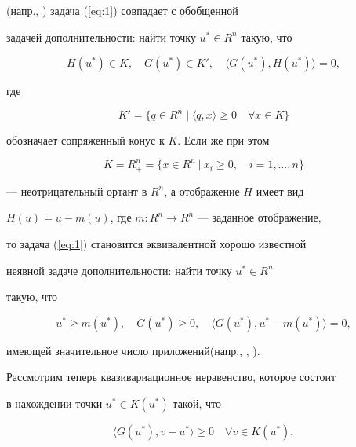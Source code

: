(напр., \cite{NNR93}) задача (\ref{eq:1}) совпадает с обобщенной 


задачей дополнительности: найти точку $u^{*} \in R^{n}$ такую, что 


$$


H(u^{*}) \in K, \quad G(u^{*}) \in K',


\quad \langle G(u^{*}), H(u^{*}) \rangle=0,


$$ 


где 


$$


K'=\{q \in R^{n} \mid \langle q, x \rangle \geq 0 \quad \forall x \in K \}


$$ 


обозначает сопряженный конус к $K$. Если же при этом


$$


K=R_{+}^{n}=\{ x \in R^{n} \ | \ x_{i} \geq 0, \quad i=1, \dotsc ,n \}


$$


--- неотрицательный ортант в $R^{n}$, а отображение $H$ имеет вид 


$H(u)=u - m(u)$, где $m: R^{n} \rightarrow R^{n}$ --- заданное отображение, 


то задача (\ref{eq:1}) становится эквивалентной хорошо известной 


неявной задаче дополнительности: найти точку $u^{*} \in R^{n}$ 


такую, что 


\begin{equation} \label{eq:2} 


u^{*} \geq m(u^{*}), \quad G(u^{*}) \geq 0, 


\quad \langle G(u^{*}), u^{*} - m(u^{*}) \rangle=0,


\end{equation}


имеющей значительное число приложений(напр., \cite{Pan81}, \cite{BL87}). 





Рассмотрим теперь квазивариационное неравенство, которое состоит 


в нахождении точки $u^{*} \in K(u^{*})$ такой, что


\begin{equation} \label{eq:3} 


\langle G(u^{*}), v - u^{*} \rangle \geq 0 \quad \forall v \in K(u^{*}),


\end{equation}


